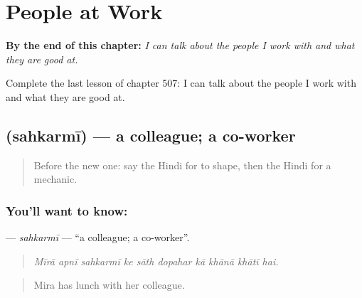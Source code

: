 
\chapter{People at Work}
\label{ch:hi-people-at-work}

\begin{chapteropening}
\textbf{By the end of this chapter:} \emph{I can talk about the people I work with and what they are good at.}

Complete the last lesson of chapter 507: I can talk about the people I work with and what they are good at.
\end{chapteropening}

\section[\texorpdfstring{\hi{सहकर्मी} (sahkarmī)}{सहकर्मी (sahkarmī)}]{ (sahkarmī) — a colleague; a co-worker}

\label{lesson:HI-C507-sahkarmi}



\begin{quote}
Before the new one: say the Hindi for to shape, then the Hindi for a mechanic.
\end{quote}

\subsection*{You'll want to know: }
\textbf{} — \emph{sahkarmī} — \textquotedblleft{}a colleague; a co-worker\textquotedblright{}.

\begin{quote}
         
\end{quote}

\begin{quote}
\emph{Mīrā apnī sahkarmī ke sāth dopahar kā khānā khātī hai.}
\end{quote}

\begin{quote}
Mira has lunch with her colleague.
\end{quote}

